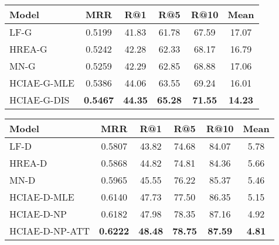 \documentclass{article}
\newcommand{\ourenc}{HCIAE\xspace}
\begin{document}
\begin{table}
\setlength{\tabcolsep}{2.0pt} 
\begin{minipage}{\textwidth}
  \begin{minipage}{0.50\textwidth} \small
    \centering
    \label{tab:generative}
    \begin{tabular}{@{}l c c c c c@{}}
      \toprule
      Model  & MRR & R@1 & R@5 & R@10 & Mean \\
      \midrule	    
      LF-G \cite{visdial} & 0.5199 & 41.83 & 61.78 & 67.59 & 17.07 \\
      HREA-G \cite{visdial} & 0.5242 & 42.28 & 62.33 & 68.17 & 16.79 \\
      MN-G \cite{visdial} & 0.5259 & 42.29 & 62.85 & 68.88 & 17.06 \\
      \midrule	    	 
      \ourenc-G-MLE & 0.5386 & 44.06 & 63.55 & 69.24 & 16.01 \\
      \ourenc-G-DIS & \textbf{0.5467} &  \textbf{44.35} &  \textbf{65.28} &  \textbf{71.55} &  \textbf{14.23}\\
     \bottomrule
    \end{tabular}        
    \label{tab:gen}
  \end{minipage}
  \begin{minipage}{0.50\textwidth} \small
    \centering
    \label{tab:discriminative}
    \begin{tabular}{@{}l c c c c c@{}}
      \toprule
      Model  & MRR & R@1 & R@5 & R@10 & Mean \\
      \midrule	    
      LF-D \cite{visdial} & 0.5807 & 43.82 & 74.68 & 84.07 & 5.78 \\
      HREA-D \cite{visdial} & 0.5868 & 44.82 & 74.81 & 84.36 & 5.66 \\
      MN-D \cite{visdial} & 0.5965 & 45.55 & 76.22 & 85.37 & 5.46 \\
      \midrule	    	 
      \ourenc-D-MLE & 0.6140 & 47.73 & 77.50 & 86.35 & 5.15 \\
      \ourenc-D-NP & 0.6182 & 47.98 & 78.35 & 87.16 & 4.92 \\
      \ourenc-D-NP-ATT & \textbf{0.6222} & \textbf{48.48} & \textbf{78.75} & \textbf{87.59} & \textbf{4.81}\\
     \bottomrule
    \end{tabular}             
    \label{tab:disc}
  \end{minipage}
\end{minipage}
\vspace{-3mm}
\end{table}
\end{document}
